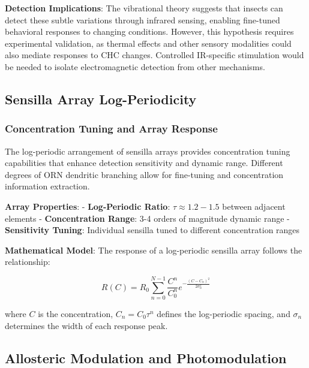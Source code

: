 \documentclass[
  13pt,
  a4paperpaper,
  12pt]{article}
\begin{document}
\textbf{Detection Implications}: The vibrational theory suggests that
insects can detect these subtle variations through infrared sensing,
enabling fine-tuned behavioral responses to changing conditions.
However, this hypothesis requires experimental validation, as thermal
effects and other sensory modalities could also mediate responses to CHC
changes. Controlled IR-specific stimulation would be needed to isolate
electromagnetic detection from other mechanisms.

\subsection{Sensilla Array
Log-Periodicity}\label{sensilla-array-log-periodicity}

\subsubsection{Concentration Tuning and Array
Response}\label{concentration-tuning-and-array-response}

The log-periodic arrangement of sensilla arrays provides concentration
tuning capabilities that enhance detection sensitivity and dynamic
range. Different degrees of ORN dendritic branching allow for
fine-tuning and concentration information extraction.

\textbf{Array Properties}: - \textbf{Log-Periodic Ratio}:
\(\tau \approx 1.2-1.5\) between adjacent elements -
\textbf{Concentration Range}: 3-4 orders of magnitude dynamic range -
\textbf{Sensitivity Tuning}: Individual sensilla tuned to different
concentration ranges

\textbf{Mathematical Model}: The response of a log-periodic sensilla
array follows the relationship:

\begin{equation}
R(C) = R_0 \sum_{n=0}^{N-1} \frac{C^n}{C_0^n} e^{-\frac{(C - C_n)^2}{2\sigma_n^2}}
\label{eq:log_periodic_response_empirical}
\end{equation}

where \(C\) is the concentration, \(C_n = C_0 \tau^n\) defines the
log-periodic spacing, and \(\sigma_n\) determines the width of each
response peak.

\subsection{Allosteric Modulation and
Photomodulation}\label{allosteric-modulation-and-photomodulation}
\end{document}
